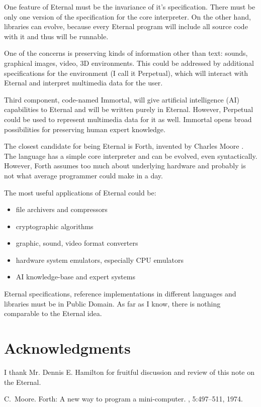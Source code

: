 \documentclass{acm_proc_article-sp}
\begin{document}
One feature of Eternal must be the invariance of it's specification. There must be only one version of the specification for the core interpreter. On the other hand, libraries can evolve, because every Eternal program will include all source code with it and thus will be runnable. 

One of the concerns is preserving kinds of information other than text: sounds, graphical images, video, 3D environments. This could be addressed by additional specifications for the environment (I call it Perpetual), which will interact with Eternal and interpret multimedia data for the user.

Third component, code-named Immortal, will give artificial intelligence (AI) capabilities to Eternal and will be written purely in Eternal. However, Perpetual could be used to represent multimedia data for it as well. Immortal opens broad possibilities for preserving human expert knowledge.

The closest candidate for being Eternal is Forth, invented by Charles Moore \cite{moore:forth}. The language has a simple core interpreter and can be evolved, even syntactically. However, Forth assumes too much about underlying hardware and probably is not what average programmer could make in a day.

The most useful applications of Eternal could be:

\begin{itemize}
\item file archivers and compressors
\item cryptographic algorithms
\item graphic, sound, video format converters
\item hardware system emulators, especially CPU emulators
\item AI knowledge-base and expert systems
\end{itemize}

Eternal specifications, reference implementations in different languages and libraries must be in Public Domain. As far as I know, there is nothing comparable to the Eternal idea.

\section{Acknowledgments}
I thank Mr. Dennis E. Hamilton for fruitful discussion and review of this note on the Eternal.


% 

\begin{thebibliography}{1}

C.~Moore.
\newblock Forth: A new way to program a mini-computer.
, 5:497--511, 1974.

\end{thebibliography}


\balancecolumns
\end{document}
